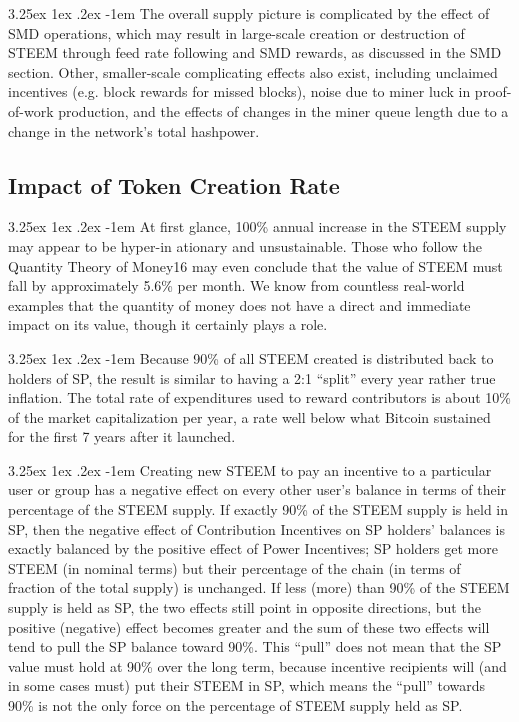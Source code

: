\documentclass{article}
\makeatletter
\renewcommand\paragraph{\@startsection{paragraph}{5}{\z@}%
  {3.25ex \@plus1ex \@minus.2ex}%
  {-1em}%
  {\normalfont\normalsize\bfseries}}
\makeatother
\begin{document}
		\paragraph{}
			The overall supply picture is complicated by the effect of SMD operations, which may result in large-scale creation or destruction of STEEM through feed rate following and SMD rewards, as discussed in the SMD section. Other, smaller-scale complicating effects also exist, including unclaimed incentives (e.g. block rewards for missed blocks), noise due to miner luck in proof-of-work production, and the effects of changes in the miner queue length due to a change in the network’s total hashpower.

		\subsection{Impact of Token Creation Rate}

			\paragraph{}
				At first glance, 100\% annual increase in the STEEM supply may appear to be hyper-in ationary and unsustainable. Those who follow the Quantity Theory of Money16 may even conclude that the value of STEEM must fall by approximately 5.6\% per month. We know from countless real-world examples that the quantity of money does not have a direct and immediate impact on its value, though it certainly plays a role.

			\paragraph{}
				Because 90\% of all STEEM created is distributed back to holders of SP, the result is similar to having a 2:1 “split” every year rather true inflation. The total rate of expenditures used to reward contributors is about 10\% of the market capitalization per year, a rate well below what Bitcoin sustained for the first 7 years after it launched.

			\paragraph{}
				Creating new STEEM to pay an incentive to a particular user or group has a negative effect on every other user’s balance in terms of their percentage of the STEEM supply. If exactly 90\% of the STEEM supply is held in SP, then the negative effect of Contribution Incentives on SP holders’ balances is exactly balanced by the positive effect of Power Incentives; SP holders get more STEEM (in nominal terms) but their percentage of the chain (in terms of fraction of the total supply) is unchanged. If less (more) than 90\% of the STEEM supply is held as SP, the two effects still point in opposite directions, but the positive (negative) effect becomes greater and the sum of these two effects will tend to pull the SP balance toward 90\%. This “pull” does not mean that the SP value must hold at 90\% over the long term, because incentive recipients will (and in some cases must) put their STEEM in SP, which means the “pull” towards 90\% is not the only force on the percentage of STEEM supply held as SP.
\end{document}
